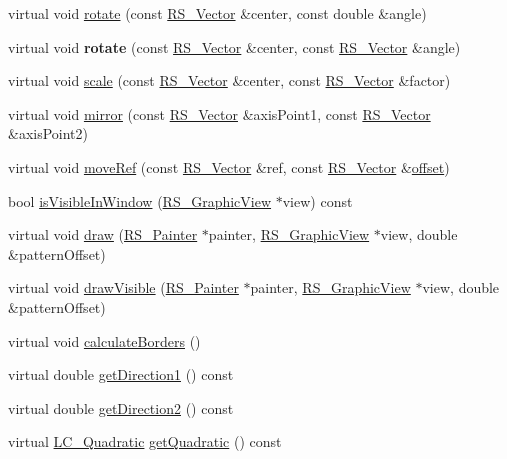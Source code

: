 \begin{DoxyCompactItemize}
\item 
virtual void \hyperlink{classRS__Ellipse_a0545cdeb7b66119b186c02ebb2129123}{rotate} (const \hyperlink{classRS__Vector}{R\-S\-\_\-\-Vector} \&center, const double \&angle)
\item 
\hypertarget{classRS__Ellipse_a79329e0e0546e790b4312bba057b486f}{virtual void {\bfseries rotate} (const \hyperlink{classRS__Vector}{R\-S\-\_\-\-Vector} \&center, const \hyperlink{classRS__Vector}{R\-S\-\_\-\-Vector} \&angle)}\label{classRS__Ellipse_a79329e0e0546e790b4312bba057b486f}

\item 
virtual void \hyperlink{classRS__Ellipse_ad51df708295ee7a8f4e2977f5b0e175a}{scale} (const \hyperlink{classRS__Vector}{R\-S\-\_\-\-Vector} \&center, const \hyperlink{classRS__Vector}{R\-S\-\_\-\-Vector} \&factor)
\item 
virtual void \hyperlink{classRS__Ellipse_a879905cb0cdf401973bdcfc8908cf99b}{mirror} (const \hyperlink{classRS__Vector}{R\-S\-\_\-\-Vector} \&axis\-Point1, const \hyperlink{classRS__Vector}{R\-S\-\_\-\-Vector} \&axis\-Point2)
\item 
virtual void \hyperlink{classRS__Ellipse_a8f992639304303b7d6d38da8e11b5f0d}{move\-Ref} (const \hyperlink{classRS__Vector}{R\-S\-\_\-\-Vector} \&ref, const \hyperlink{classRS__Vector}{R\-S\-\_\-\-Vector} \&\hyperlink{classRS__AtomicEntity_ab708a0d05c11fd7eff646243db60464a}{offset})
\item 
bool \hyperlink{classRS__Ellipse_a8a935d58ea7d3332ef11ab49c967d038}{is\-Visible\-In\-Window} (\hyperlink{classRS__GraphicView}{R\-S\-\_\-\-Graphic\-View} $\ast$view) const 
\item 
virtual void \hyperlink{classRS__Ellipse_aae18c3892e89c21476717602282f4bc6}{draw} (\hyperlink{classRS__Painter}{R\-S\-\_\-\-Painter} $\ast$painter, \hyperlink{classRS__GraphicView}{R\-S\-\_\-\-Graphic\-View} $\ast$view, double \&pattern\-Offset)
\item 
virtual void \hyperlink{classRS__Ellipse_a151d62f780747c6a242f0fc9256cab4a}{draw\-Visible} (\hyperlink{classRS__Painter}{R\-S\-\_\-\-Painter} $\ast$painter, \hyperlink{classRS__GraphicView}{R\-S\-\_\-\-Graphic\-View} $\ast$view, double \&pattern\-Offset)
\item 
virtual void \hyperlink{classRS__Ellipse_aed3b344c0694580cb4ff8965c32281fb}{calculate\-Borders} ()
\item 
virtual double \hyperlink{classRS__Ellipse_a185c1db1b6fe6599c4a75f7b00d29c20}{get\-Direction1} () const 
\item 
virtual double \hyperlink{classRS__Ellipse_ae13876b4677d42d91e21fbb30d3fe5e5}{get\-Direction2} () const 
\item 
virtual \hyperlink{classLC__Quadratic}{L\-C\-\_\-\-Quadratic} \hyperlink{classRS__Ellipse_a97afba1fce7cf27539a48a9d3204e9f8}{get\-Quadratic} () const 
\end{DoxyCompactItemize}
